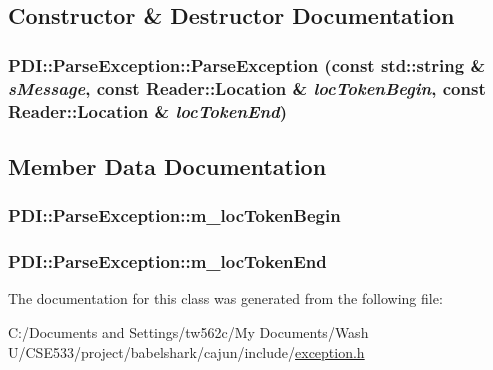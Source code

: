 \subsection{Constructor \& Destructor Documentation}
\hypertarget{class_p_d_i_1_1_parse_exception_07a07ade97ed40b0d04be7ee03d687a2}{
\subsubsection[{ParseException}]{\setlength{\rightskip}{0pt plus 5cm}PDI::ParseException::ParseException (const std::string \& {\em sMessage}, \/  const {\bf Reader::Location} \& {\em locTokenBegin}, \/  const {\bf Reader::Location} \& {\em locTokenEnd})}}
\label{class_p_d_i_1_1_parse_exception_07a07ade97ed40b0d04be7ee03d687a2}




\subsection{Member Data Documentation}
\hypertarget{class_p_d_i_1_1_parse_exception_0330cdecfe72277cc69f878a20cd76ef}{
\subsubsection[{m\_\-locTokenBegin}]{ {\bf PDI::ParseException::m\_\-locTokenBegin}}}
\label{class_p_d_i_1_1_parse_exception_0330cdecfe72277cc69f878a20cd76ef}


\hypertarget{class_p_d_i_1_1_parse_exception_8cf4c86a198fff7f3115e7c97f1a6c18}{
\subsubsection[{m\_\-locTokenEnd}]{ {\bf PDI::ParseException::m\_\-locTokenEnd}}}
\label{class_p_d_i_1_1_parse_exception_8cf4c86a198fff7f3115e7c97f1a6c18}




The documentation for this class was generated from the following file:\begin{CompactItemize}
\item 
C:/Documents and Settings/tw562c/My Documents/Wash U/CSE533/project/babelshark/cajun/include/\hyperlink{exception_8h}{exception.h}\end{CompactItemize}
